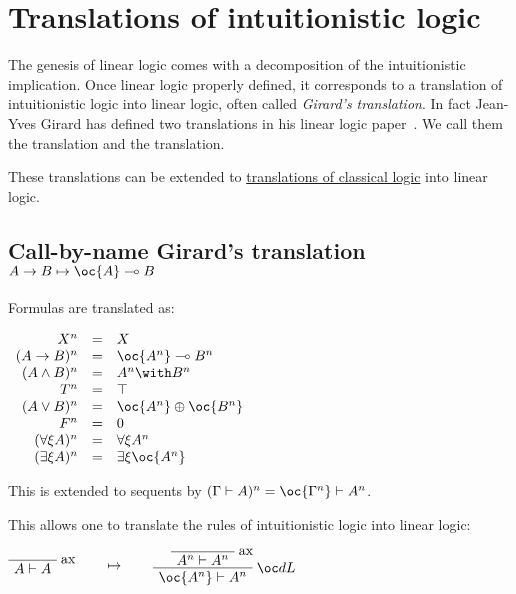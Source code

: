 \chapter{Translations of intuitionistic logic}\label{translations-of-intuitionistic-logic}

The genesis of linear logic comes with a decomposition of the
intuitionistic implication. Once linear logic properly defined, it
corresponds to a translation of intuitionistic logic into linear logic,
often called \emph{Girard's translation}. In fact Jean-Yves Girard has
defined two translations in his linear logic paper~\cite{linearlogic}. We call them the  translation and the  translation.

These translations can be extended to \hyperref[translations-of-classical-logic]{translations of classical logic} into linear logic.

\section{\texorpdfstring{Call-by-name Girard's translation \(A\imp B \mapsto \oc{A}\limp B\)}{Call-by-name Girard's translation A\textbackslash{}imp B \textbackslash{}mapsto \textbackslash{}oc\{A\}\textbackslash{}limp B}}\label{call-by-name-girards-translation-aimp-b-mapsto-ocalimp-b}

Formulas are translated as:

\(\begin{array}{rcl}
X^n &  = &  X \\
(A\imp B)^n &  = &  \oc{A^n}\limp B^n \\
(A\wedge B)^n &  = &  A^n \with B^n \\
T^n &  = &  \top \\
(A\vee B)^n &  = &  \oc{A^n}\plus\oc{B^n} \\
F^n &  = &  \zero \\
(\forall\xi A)^n &  = &  \forall\xi A^n \\
(\exists\xi A)^n &  = &  \exists\xi \oc{A^n}
\end{array}\)

This is extended to sequents by
\((\Gamma\vdash A)^n = \oc{\Gamma^n}\vdash A^n\).

This allows one to translate the rules of intuitionistic logic into
linear logic:

\(\LabelRule{\rulename{ax}}
\NulRule{A\vdash A}
\DisplayProof
\qquad\mapsto\qquad
\LabelRule{\rulename{ax}}
\NulRule{A^n\vdash A^n}
\LabelRule{\oc d L}
\UnaRule{\oc{A^n}\vdash A^n}
\DisplayProof\)

